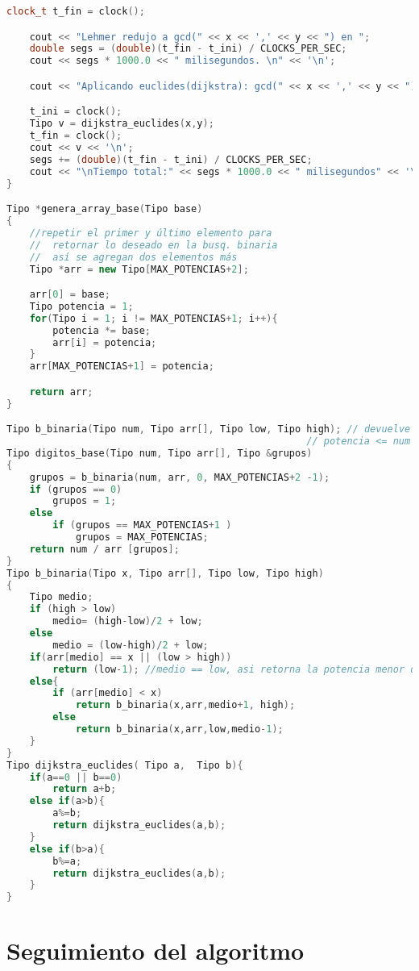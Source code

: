 \begin{lstlisting}[language=C++]
    clock_t t_fin = clock();

    cout << "Lehmer redujo a gcd(" << x << ',' << y << ") en ";
    double segs = (double)(t_fin - t_ini) / CLOCKS_PER_SEC;
    cout << segs * 1000.0 << " milisegundos. \n" << '\n';

    cout << "Aplicando euclides(dijkstra): gcd(" << x << ',' << y << ") = ";

    t_ini = clock();
    Tipo v = dijkstra_euclides(x,y);
    t_fin = clock();
    cout << v << '\n';
    segs += (double)(t_fin - t_ini) / CLOCKS_PER_SEC;
    cout << "\nTiempo total:" << segs * 1000.0 << " milisegundos" << '\n';
}

Tipo *genera_array_base(Tipo base)
{
    //repetir el primer y último elemento para
    //  retornar lo deseado en la busq. binaria
    //  así se agregan dos elementos más
    Tipo *arr = new Tipo[MAX_POTENCIAS+2];

    arr[0] = base;
    Tipo potencia = 1;
    for(Tipo i = 1; i != MAX_POTENCIAS+1; i++){
        potencia *= base;
        arr[i] = potencia;
    }
    arr[MAX_POTENCIAS+1] = potencia;

    return arr;
}

Tipo b_binaria(Tipo num, Tipo arr[], Tipo low, Tipo high); // devuelve el valor de la
                                                    // potencia <= num dentro de arr
Tipo digitos_base(Tipo num, Tipo arr[], Tipo &grupos)
{
    grupos = b_binaria(num, arr, 0, MAX_POTENCIAS+2 -1);
    if (grupos == 0)
        grupos = 1;
    else
        if (grupos == MAX_POTENCIAS+1 )
            grupos = MAX_POTENCIAS;
    return num / arr [grupos];
}
Tipo b_binaria(Tipo x, Tipo arr[], Tipo low, Tipo high)
{
    Tipo medio;
    if (high > low)
        medio= (high-low)/2 + low;
    else
        medio = (low-high)/2 + low;
    if(arr[medio] == x || (low > high))
        return (low-1); //medio == low, asi retorna la potencia menor de la base
    else{
        if (arr[medio] < x)
            return b_binaria(x,arr,medio+1, high);
        else
            return b_binaria(x,arr,low,medio-1);
    }
}
Tipo dijkstra_euclides( Tipo a,  Tipo b){
    if(a==0 || b==0)
        return a+b;
    else if(a>b){
        a%=b;
        return dijkstra_euclides(a,b);
    }
    else if(b>a){
        b%=a;
        return dijkstra_euclides(a,b);
    }
}
\end{lstlisting}

\section{Seguimiento del algoritmo}

